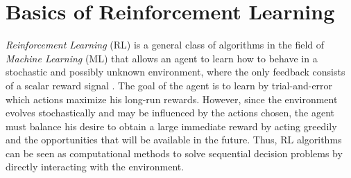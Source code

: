 \section{Basics of Reinforcement Learning}
\label{sec:basics_reinforcement_learning}

\emph{Reinforcement Learning} (RL) is a general class of algorithms in the field of \emph{Machine Learning} (ML) that allows an agent to learn how to behave in a stochastic and possibly unknown environment, where the only feedback consists of a scalar reward signal \cite{sutton1998introduction}. The goal of the agent is to learn by trial-and-error which actions maximize his long-run rewards. However, since the environment evolves stochastically and may be influenced by the actions chosen, the agent must balance his desire to obtain a large immediate reward by acting greedily and the opportunities that will be available in the future. Thus, RL algorithms can be seen as computational methods to solve sequential decision problems by directly interacting with the environment.\\

